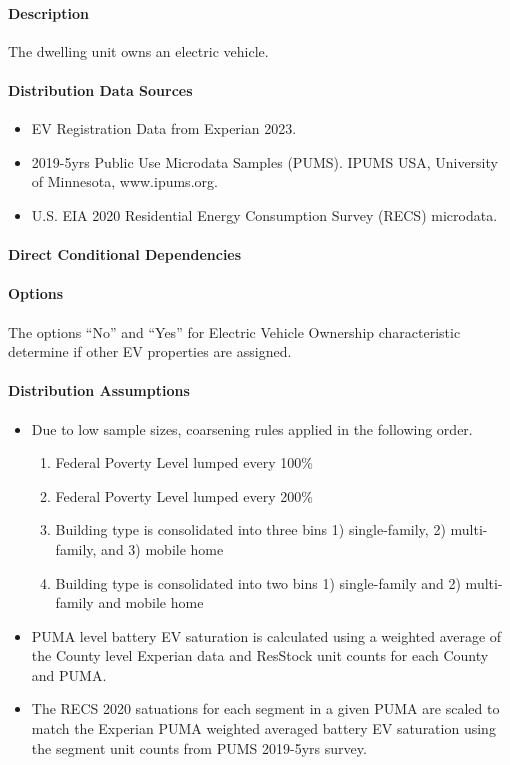 \paragraph{Description}
% 
The dwelling unit owns an electric vehicle.

\paragraph{Distribution Data Sources}
% 
\begin{itemize}
  \item EV Registration Data from Experian 2023.
  \item 2019-5yrs Public Use Microdata Samples (PUMS). IPUMS USA, University of Minnesota, www.ipums.org.
  \item U.S. EIA 2020 Residential Energy Consumption Survey (RECS) microdata.

\end{itemize}

\paragraph{Direct Conditional Dependencies}


\paragraph{Options}
The options ``No'' and ``Yes'' for Electric Vehicle Ownership characteristic determine if other EV properties are assigned.

\paragraph{Distribution Assumptions}
% 
\begin{itemize}
  \item Due to low sample sizes, coarsening rules applied in the following order.
  \begin{enumerate}
    \item Federal Poverty Level lumped every 100\%
    \item Federal Poverty Level lumped every 200\%
    \item Building type is consolidated into three bins 1) single-family, 2) multi-family, and 3) mobile home
    \item Building type is consolidated into two bins 1) single-family and 2) multi-family and mobile home
  \end{enumerate}
  \item PUMA level battery EV saturation is calculated using a weighted average of the County level Experian data and ResStock unit counts for each County and PUMA.
  \item The RECS 2020 satuations for each segment in a given PUMA are scaled to match the Experian PUMA weighted averaged battery EV saturation using the segment unit counts from PUMS 2019-5yrs survey.
\end{itemize}
